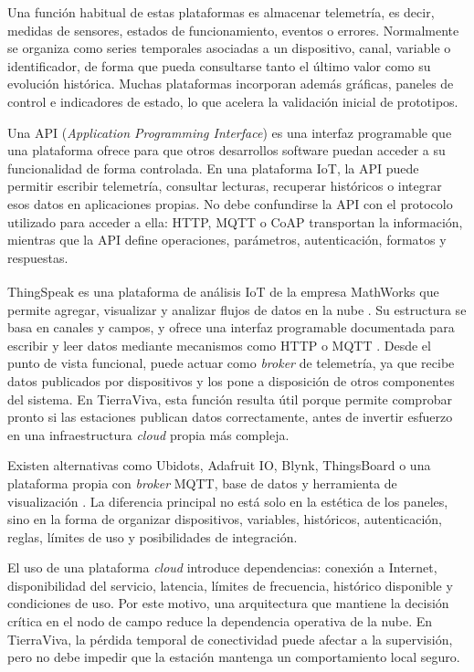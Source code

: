 Una función habitual de estas plataformas es almacenar telemetría, es decir, medidas de sensores, estados de funcionamiento, eventos o errores. Normalmente se organiza como series temporales asociadas a un dispositivo, canal, variable o identificador, de forma que pueda consultarse tanto el último valor como su evolución histórica. Muchas plataformas incorporan además gráficas, paneles de control e indicadores de estado, lo que acelera la validación inicial de prototipos.

Una API (\textit{Application Programming Interface}) es una interfaz programable que una plataforma ofrece para que otros desarrollos software puedan acceder a su funcionalidad de forma controlada. En una plataforma IoT, la API puede permitir escribir telemetría, consultar lecturas, recuperar históricos o integrar esos datos en aplicaciones propias. No debe confundirse la API con el protocolo utilizado para acceder a ella: HTTP, MQTT o CoAP transportan la información, mientras que la API define operaciones, parámetros, autenticación, formatos y respuestas.

ThingSpeak es una plataforma de análisis IoT de la empresa MathWorks\textsuperscript{\textregistered} que permite agregar, visualizar y analizar flujos de datos en la nube \cite{mathworks_thingspeak_product}. Su estructura se basa en canales y campos, y ofrece una interfaz programable documentada para escribir y leer datos mediante mecanismos como HTTP o MQTT \cite{thingspeak_write_data,thingspeak_read_data}. Desde el punto de vista funcional, puede actuar como \textit{broker} de telemetría, ya que recibe datos publicados por dispositivos y los pone a disposición de otros componentes del sistema. En TierraViva, esta función resulta útil porque permite comprobar pronto si las estaciones publican datos correctamente, antes de invertir esfuerzo en una infraestructura \textit{cloud} propia más compleja.

Existen alternativas como Ubidots, Adafruit IO, Blynk, ThingsBoard o una plataforma propia con \textit{broker} MQTT, base de datos y herramienta de visualización \cite{ubidots_basics,adafruit_io_api,blynk_datastreams,thingsboard_telemetry}. La diferencia principal no está solo en la estética de los paneles, sino en la forma de organizar dispositivos, variables, históricos, autenticación, reglas, límites de uso y posibilidades de integración.

El uso de una plataforma \textit{cloud} introduce dependencias: conexión a Internet, disponibilidad del servicio, latencia, límites de frecuencia, histórico disponible y condiciones de uso. Por este motivo, una arquitectura que mantiene la decisión crítica en el nodo de campo reduce la dependencia operativa de la nube. En TierraViva, la pérdida temporal de conectividad puede afectar a la supervisión, pero no debe impedir que la estación mantenga un comportamiento local seguro.

